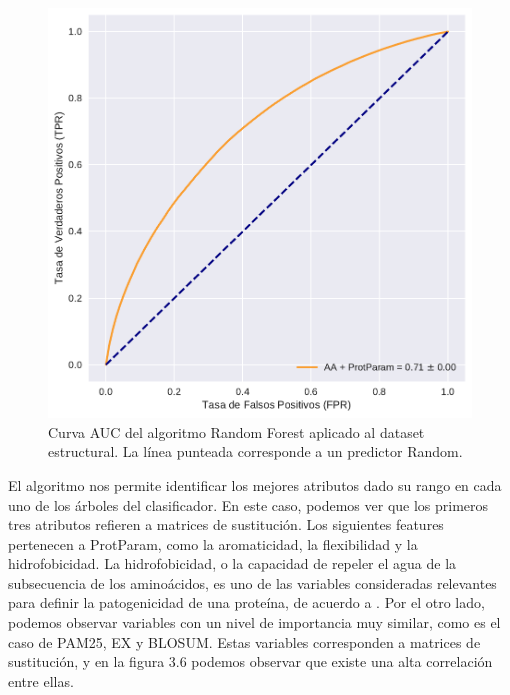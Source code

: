 \begin{figure}[h]
    \centering
    \includegraphics[scale=0.55]{documents/latex/figures/3/auc_1.pdf}
    \caption{Curva AUC del algoritmo Random Forest aplicado al dataset estructural. La línea punteada corresponde a un predictor Random.}
    \label{fig:auc_1}
\end{figure}


El algoritmo nos permite identificar los mejores atributos dado su rango en cada uno de los árboles del clasificador. En este caso, podemos ver que los primeros tres atributos refieren a matrices de sustitución. Los siguientes features pertenecen a ProtParam, como la aromaticidad, la flexibilidad y la hidrofobicidad. La hidrofobicidad, o la capacidad de repeler el agua de la subsecuencia de los aminoácidos, es uno de las variables consideradas relevantes para definir la patogenicidad de una proteína, de acuerdo a \cite{Wang2016}. Por el otro lado, podemos observar variables con un nivel de importancia muy similar, como es el caso de PAM25, EX y BLOSUM. Estas variables corresponden a matrices de sustitución, y en la figura 3.6 podemos observar que existe una alta correlación entre ellas.  

